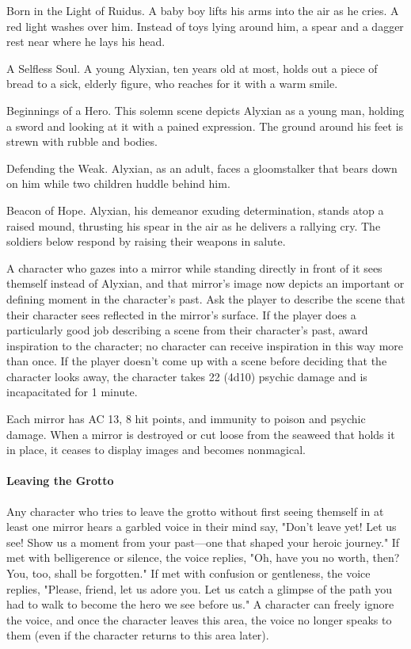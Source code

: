 \documentclass[10pt,a4paper,twoside,twocolumn,openany,nodeprecatedcode]{dndbook}
\begin{document}
\begin{description}[nolistsep]
\item[Mirror 1:]
Born in the Light of Ruidus. A baby boy lifts his arms into the air as he cries. A red light washes over him. Instead of toys lying around him, a spear and a dagger rest near where he lays his head.
\item[Mirror 2:]
A Selfless Soul. A young Alyxian, ten years old at most, holds out a piece of bread to a sick, elderly figure, who reaches for it with a warm smile.
\item[Mirror 3:]
Beginnings of a Hero. This solemn scene depicts Alyxian as a young man, holding a sword and looking at it with a pained expression. The ground around his feet is strewn with rubble and bodies.
\item[Mirror 4:]
Defending the Weak. Alyxian, as an adult, faces a gloomstalker that bears down on him while two children huddle behind him.
\item[Mirror 5:]
Beacon of Hope. Alyxian, his demeanor exuding determination, stands atop a raised mound, thrusting his spear in the air as he delivers a rallying cry. The soldiers below respond by raising their weapons in salute.
\end{description}

A character who gazes into a mirror while standing directly in front of it sees themself instead of Alyxian, and that mirror's image now depicts an important or defining moment in the character's past. Ask the player to describe the scene that their character sees reflected in the mirror's surface. If the player does a particularly good job describing a scene from their character's past, award inspiration to the character; no character can receive inspiration in this way more than once. If the player doesn't come up with a scene before deciding that the character looks away, the character takes 22 (4d10) psychic damage and is incapacitated for 1 minute.

Each mirror has AC 13, 8 hit points, and immunity to poison and psychic damage. When a mirror is destroyed or cut loose from the seaweed that holds it in place, it ceases to display images and becomes nonmagical.

\paragraph{Leaving the Grotto}
Any character who tries to leave the grotto without first seeing themself in at least one mirror hears a garbled voice in their mind say, "Don't leave yet! Let us see! Show us a moment from your past—one that shaped your heroic journey." If met with belligerence or silence, the voice replies, "Oh, have you no worth, then? You, too, shall be forgotten." If met with confusion or gentleness, the voice replies, "Please, friend, let us adore you. Let us catch a glimpse of the path you had to walk to become the hero we see before us." A character can freely ignore the voice, and once the character leaves this area, the voice no longer speaks to them (even if the character returns to this area later).
\end{document}

